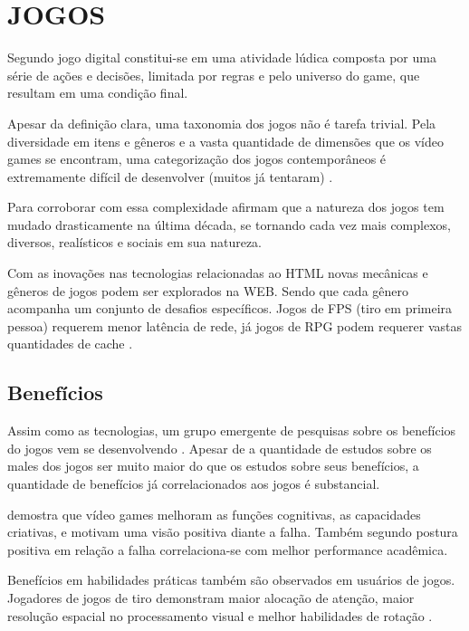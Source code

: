 \section{JOGOS}

Segundo \autocite{indieGamesLemes} jogo digital constitui-se em uma
atividade lúdica composta por uma série de ações e decisões,
limitada por regras e pelo universo do game, que resultam em uma
condição final.

Apesar da definição clara, uma taxonomia dos jogos não é tarefa
trivial. Pela diversidade em itens e gêneros e a vasta quantidade de
dimensões que os vídeo games se encontram, uma categorização dos
jogos contemporâneos é extremamente difícil de desenvolver (muitos
já tentaram) \autocite[pp. 60]{gamebenefits}.

Para corroborar com essa complexidade \cite{gamebenefits} afirmam que
a natureza dos jogos tem mudado drasticamente na última década, se
tornando cada vez mais complexos, diversos, realísticos e sociais em
sua natureza.

Com as inovações nas tecnologias relacionadas ao HTML novas
mecânicas e gêneros de jogos podem ser explorados na WEB. Sendo
que cada gênero acompanha um conjunto de desafios específicos.
Jogos de FPS (tiro em primeira pessoa) requerem menor latência de
rede, já jogos de RPG podem requerer vastas quantidades de cache
\autocite{html5mostwanted}.

\subsection{Benefícios}

Assim como as tecnologias, um grupo emergente de pesquisas sobre os
benefícios do jogos vem se desenvolvendo \cite{gamebenefits}. Apesar
de a quantidade de estudos sobre os males dos jogos ser muito maior do
que os estudos sobre seus benefícios, a quantidade de benefícios já
correlacionados aos jogos é substancial.

\autocite{gamebenefits} demostra que vídeo games melhoram as funções
cognitivas, as capacidades criativas, e motivam uma visão positiva
diante a falha. Também segundo \autocite{gamebenefits} postura positiva
em relação a falha correlaciona-se com melhor performance acadêmica.

Benefícios em habilidades práticas também são observados em
usuários de jogos. Jogadores de jogos de tiro demonstram maior
alocação de atenção, maior resolução espacial no processamento
visual e melhor habilidades de rotação \autocite{gamebenefits}.

